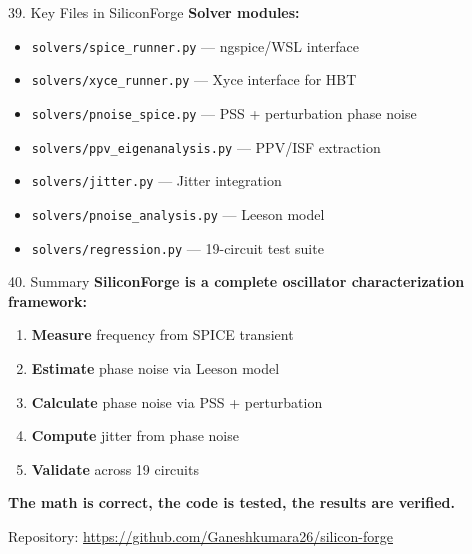 \documentclass[aspectratio=169, 11pt]{beamer}
\begin{document}
\begin{frame}{39. Key Files in SiliconForge}
    \textbf{Solver modules:}

    \vspace{0.5em}
    \begin{itemize}
        \item \texttt{solvers/spice\_runner.py} — ngspice/WSL interface
        \item \texttt{solvers/xyce\_runner.py} — Xyce interface for HBT
        \item \texttt{solvers/pnoise\_spice.py} — PSS + perturbation phase noise
        \item \texttt{solvers/ppv\_eigenanalysis.py} — PPV/ISF extraction
        \item \texttt{solvers/jitter.py} — Jitter integration
        \item \texttt{solvers/pnoise\_analysis.py} — Leeson model
        \item \texttt{solvers/regression.py} — 19-circuit test suite
    \end{itemize}
\end{frame}

\begin{frame}{40. Summary}
    \textbf{SiliconForge is a complete oscillator characterization framework:}

    \vspace{0.5em}
    \begin{enumerate}
        \item \textbf{Measure} frequency from SPICE transient
        \item \textbf{Estimate} phase noise via Leeson model
        \item \textbf{Calculate} phase noise via PSS + perturbation
        \item \textbf{Compute} jitter from phase noise
        \item \textbf{Validate} across 19 circuits
    \end{enumerate}

    \vspace{0.5em}
    \textbf{The math is correct, the code is tested, the results are verified.}

    \vspace{0.5em}
    Repository: \url{https://github.com/Ganeshkumara26/silicon-forge}
\end{frame}
\end{document}
